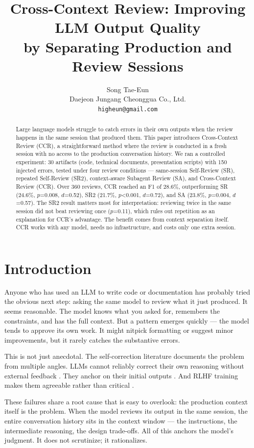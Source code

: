 \documentclass[11pt]{article}
\title{Cross-Context Review: Improving LLM Output Quality\\by Separating Production and Review Sessions}
\author{Song Tae-Eun \\
  Daejeon Jungang Cheonggua Co., Ltd. \\
  \texttt{higheun@gmail.com}}
\begin{document}
\maketitle

\begin{abstract}
Large language models struggle to catch errors in their own outputs when the review happens in the same session that produced them. This paper introduces Cross-Context Review (CCR), a straightforward method where the review is conducted in a fresh session with no access to the production conversation history. We ran a controlled experiment: 30 artifacts (code, technical documents, presentation scripts) with 150 injected errors, tested under four review conditions --- same-session Self-Review (SR), repeated Self-Review (SR2), context-aware Subagent Review (SA), and Cross-Context Review (CCR). Over 360 reviews, CCR reached an F1 of 28.6\%, outperforming SR (24.6\%, $p$=0.008, $d$=0.52), SR2 (21.7\%, $p$<0.001, $d$=0.72), and SA (23.8\%, $p$=0.004, $d$=0.57). The SR2 result matters most for interpretation: reviewing twice in the same session did not beat reviewing once ($p$=0.11), which rules out repetition as an explanation for CCR's advantage. The benefit comes from context separation itself. CCR works with any model, needs no infrastructure, and costs only one extra session.
\end{abstract}

\section{Introduction}

Anyone who has used an LLM to write code or documentation has probably tried the obvious next step: asking the same model to review what it just produced. It seems reasonable. The model knows what you asked for, remembers the constraints, and has the full context. But a pattern emerges quickly --- the model tends to approve its own work. It might nitpick formatting or suggest minor improvements, but it rarely catches the substantive errors.

This is not just anecdotal. The self-correction literature documents the problem from multiple angles. LLMs cannot reliably correct their own reasoning without external feedback \citep{huang2024llms,kamoi2024when}. They anchor on their initial outputs \citep{lou2026anchoring}. And RLHF training makes them agreeable rather than critical \citep{sharma2024towards,panickssery2024llm}.

These failures share a root cause that is easy to overlook: the production context itself is the problem. When the model reviews its output in the same session, the entire conversation history sits in the context window --- the instructions, the intermediate reasoning, the design trade-offs. All of this anchors the model's judgment. It does not scrutinize; it rationalizes.
\end{document}
